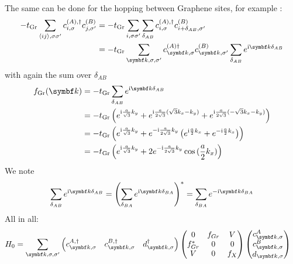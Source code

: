 \documentclass[../notes.tex]{subfiles}
\begin{document}
The same can be done for the hopping between Graphene sites, for example :
\begin{align}
	-t_{\mathrm{Gr}} \sum_{\langle ij \rangle, \sigma \sigma^{\prime}} c_{i, \sigma}^{(A), \dagger} c_{j, \sigma^{\prime}}^{(B)}
	&= -t_{\mathrm{Gr}} \sum_{i, \sigma \sigma^{\prime}} \sum_{\delta_{AB}} c_{i, \sigma}^{(A), \dagger} c_{i + \delta_{AB} , \sigma^{\prime}}^{(B)} \\
	&= -t_{\mathrm{Gr}} \sum_{\vb{k}, \sigma, \sigma^{\prime}}  c_{\vb{k}, \sigma}^{(A) \dagger} c_{\vb{k}, \sigma^{\prime}}^{(B)} \sum_{\delta_{AB}} e^{\iu \vb{k} \delta_{AB}}
\end{align}
with again the sum over \(\delta_{AB}\)
\begin{align}
	f_{\mathrm{Gr}} (\vb{k}) &= -t_{\mathrm{Gr}} \sum_{\delta_{AB}} e^{\iu \vb{k} \delta_{AB}} \\
	&= -t_{\mathrm{Gr}} \left(
	e^{\iu \frac{a}{\sqrt{3}} k_y} +
	e^{\iu \frac{a}{2\sqrt{3}} (\sqrt{3} k_x - k_y)} +
	e^{\iu \frac{a}{2\sqrt{3}} (-\sqrt{3} k_x - k_y)} \right) \\
	&= -t_{\mathrm{Gr}} \left(
	e^{\iu \frac{a}{\sqrt{3}} k_y} +
	e^{-\iu \frac{a}{2\sqrt{3}} k_y} \left(
	e^{\iu \frac{a}{2} k_x} + e^{-\iu \frac{a}{2} k_x}
	\right) \right) \\
	&= -t_{\mathrm{Gr}} \left(
	e^{\iu \frac{a}{\sqrt{3}} k_y} +
	2 e^{-\iu \frac{a}{2\sqrt{3}} k_y}
	\cos{(\frac{a}{2} k_x)} \right)
\end{align}
We note 
\begin{align}
	\sum_{\delta_{AB}} e^{\iu \vb{k} \delta_{AB}} = \left( \sum_{\delta_{BA}} e^{\iu \vb{k} \delta_{BA}} \right)^* = \sum_{\delta_{BA}} e^{-\iu \vb{k} \delta_{BA}}
\end{align}
All in all:
\begin{align}
	H_0 &= \sum_{\vb{k}, \sigma, \sigma^{\prime}} \begin{pmatrix} c_{\vb{k}, \sigma}^{A, \dagger} & c_{\vb{k}, \sigma}^{B, \dagger} & d_{\vb{k}, \sigma}^{\dagger} \end{pmatrix}
	\begin{pmatrix}
		0 & f_{Gr} & V \\
		f_{Gr}^* & 0 & 0 \\
		V & 0 & f_{X}
	\end{pmatrix} \begin{pmatrix} c_{\vb{k}, \sigma}^{A} \\ c_{\vb{k}, \sigma}^{B} \\ d_{\vb{k}, \sigma} \end{pmatrix}
	\label{eq:EG-X Hamiltonian non-interacting matrix appendix}
\end{align}
\end{document}
